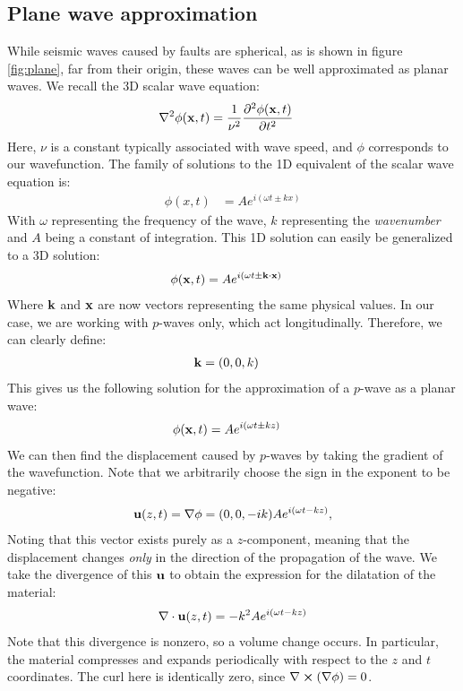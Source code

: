 \subsection{Plane wave approximation}
While seismic waves caused by faults are spherical, as is shown in figure \ref{fig:plane}, far from their origin, these waves can be well approximated as planar waves. We recall the 3D scalar wave equation:
\begin{align}
    \label{eqn:wave}
    \nabla^2 \phi(\vb{x}, t) &= \frac{1}{\nu^2}\frac{\partial ^2\phi(\vb{x}, t)}{\partial t^2}
\end{align}
Here, $\nu$ is a constant typically associated with wave speed, and $\phi$ corresponds to our wavefunction. The family of solutions to the 1D equivalent of the scalar wave equation is:
\begin{align}
    \phi(x,t) &= Ae^{i(\omega t\pm kx)}
\end{align}
With $\omega$ representing the frequency of the wave, $k$ representing the \textit{wavenumber} and $A$ being a constant of integration. This 1D solution can easily be generalized to a 3D solution:
\begin{align}
    \phi(\vb{x}, t) &= Ae^{i(\omega t \pm \vb{k}\cdot\vb{x})}
\end{align}
Where $\vb{k}$ and $\vb{x}$ are now vectors representing the same physical values. In our case, we are working with $p$-waves only, which act longitudinally. Therefore, we can clearly define:
\begin{align*}
    \vb{k} &= (0,0,k)
\end{align*}
This gives us the following solution for the approximation of a $p$-wave as a planar wave:
\begin{align}
    \phi(\vb{x}, t) &= Ae^{i(\omega t \pm kz)}
\end{align}
We can then find the displacement caused by $p$-waves by taking the gradient of the wavefunction. Note that we arbitrarily choose the sign in the exponent to be negative:
\begin{align}
    \vb{u}(z,t)=\nabla \phi = (0,0,-ik) Ae^{i(\omega t-kz)},
\end{align}
Noting that this vector exists purely as a $z$-component, meaning that the displacement changes \textit{only} in the direction of the propagation of the wave.
We take the divergence of this $\vb{u}$ to obtain the expression for the dilatation of the material:
\begin{align}
    \nabla\cdot\vb{u}(z,t) = -k^2Ae^{i(\omega t-kz)}
\end{align}
Note that this divergence is nonzero, so a volume change occurs. In particular, the material compresses and expands periodically with respect to the $z$ and $t$ coordinates. The curl here is identically zero, since $\nabla\cross\del{\nabla\phi}=0$. 

